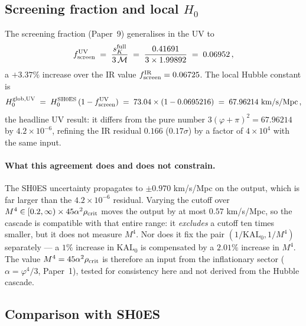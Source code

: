 \documentclass[12pt,a4paper]{article}
\newcommand{\phiG}{\varphi}
\newcommand{\KAL}{\mathrm{KAL}_0}
\newcommand{\MIRA}{\mathcal{M}}
\newcommand{\fsc}{f_{\mathrm{screen}}}
\newcommand{\sK}{s_K}
\newcommand{\rhoc}{\rho_{\rm crit}}
\begin{document}
\subsection{Screening fraction and local $H_0$}

The screening fraction (Paper~9) generalises in the UV to
\begin{equation}
  \fsc^{\rm UV}
  \;=\; \frac{\sK^{\rm full}}{3\,\MIRA}
  \;=\; \frac{0.41691}{3\times 1.99892}
  \;=\; 0.06952\,,
  \label{eq:fUV}
\end{equation}
a $+3.37\%$ increase over the IR value $\fsc^{\rm IR} = 0.06725$.
The local Hubble constant is
\begin{equation}
  H_0^{\rm glob,UV}
  \;=\; H_0^{\rm SH0ES}\,(1 - \fsc^{\rm UV})
  \;=\; 73.04\times(1 - 0.0695216)
  \;=\; 67.96214 \text{ km/s/Mpc}\,,
  \label{eq:H0UV}
\end{equation}
the headline UV result: it differs from the pure number
$3(\phiG+\pi)^2 = 67.96214$ by $4.2\times10^{-6}$, refining the IR residual
$0.166$ ($0.17\sigma$) by a factor of $4\times10^4$ with the same input.

\paragraph{What this agreement does and does not constrain.}
The SH0ES uncertainty propagates to $\pm0.970$ km/s/Mpc on the output, which is
far larger than the $4.2\times10^{-6}$ residual. Varying the cutoff over
$M^4 \in [0.2, \infty)\times 45\alpha^2\rhoc$ moves the output by at most
$0.57$ km/s/Mpc, so the cascade is compatible with that entire range: it
\emph{excludes} a cutoff ten times smaller, but it does not measure $M^4$.
Nor does it fix the pair $(1/\KAL, 1/M^4)$ separately --- a $1\%$ increase in
$\KAL$ is compensated by a $2.01\%$ increase in $M^4$. The value
$M^4 = 45\alpha^2\rhoc$ is therefore an input from the inflationary sector
($\alpha=\phiG^4/3$, Paper~1), tested for consistency here and not derived
from the Hubble cascade.

\subsection{Comparison with SH0ES}
\end{document}
